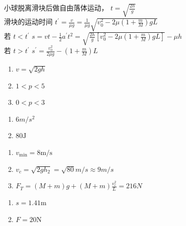 \item 小球脱离滑块后做自由落体运动， $t=\sqrt {\frac {2 h}{g}}$\\ 滑块的运动时间 $t^{\prime }=\frac {v}{\mu g}=\frac {1}{\mu g} \sqrt {v_{0}^{2}-2 \mu \left (1+\frac {m}{M}\right ) g L}$ \\ 若 $t<t^{\prime }$ \quad $s=v t-\frac {1}{2} a^{\prime } t^{2}=\sqrt {\frac {2 h}{g}\left [v_{0}^{2}-2 \mu \left (1+\frac {m}{M}\right ) g L\right ]}-\mu h$\\ 若 $t>t^{\prime }$ \quad $s^{\prime }=\frac {v_{0}^{2}}{2 \mu g}-\left (1+\frac {m}{M}\right ) L$
\item \begin {enumerate} \renewcommand {\labelenumi }{\arabic {enumi}.} \item $v=\sqrt {2 g h}$ \item $1<p<5$ \item $0<p<3$ \end {enumerate} \par \par 
\item \begin {enumerate} \renewcommand {\labelenumi }{\arabic {enumi}.} \item $6 m / s^{2}$ \item $80 \mathrm {J}$ \par \par \par \end {enumerate} \par \par 
\item \begin {enumerate} \renewcommand {\labelenumi }{\arabic {enumi}.} \item $v_{\min }=8 \mathrm {m} / \mathrm {s}$ \item $v_{c}=\sqrt {2 g h_{2}}=\sqrt {80} m / s \approx 9 m / s$ \item $F_{T}=(M+m) g+(M+m) \frac {v_{c}^{2}}{L}=216 N$ \end {enumerate} \par \par 
\item \begin {enumerate} \renewcommand {\labelenumi }{\arabic {enumi}.} \item $ s=1.41 \mathrm {m}$ \item $F=20 \mathrm {N}$ \par \par \par \end {enumerate} \par \par 

